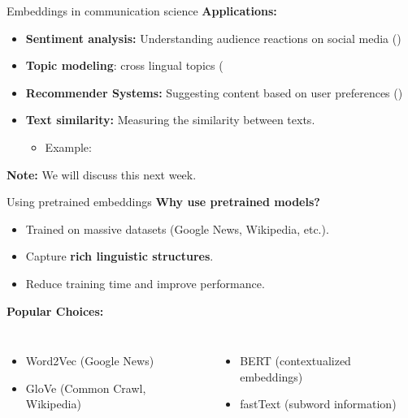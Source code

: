 \documentclass[handout]{beamer}
\begin{document}
\begin{frame}[fragile]{Embeddings in communication science}
    \textbf{Applications:}
    \begin{itemize}
        \item \textbf{Sentiment analysis:} Understanding audience reactions on social media (\cite{rudkowsky2018more})
        \item \textbf{Topic modeling}: cross lingual topics (\cite{han2020reproducible)}
        \item \textbf{Recommender Systems:} Suggesting content based on user preferences (\cite{Loecherbach2020})
    \item \textbf{Text similarity:} Measuring the similarity between texts.
        \begin{itemize}
            \item Example: \cite{Brinberg2021}
        \end{itemize}
\end{itemize}
\textbf{Note:} We will discuss this next week.
\end{frame}


\begin{frame}{Using pretrained embeddings}
    \textbf{Why use pretrained models?}
    \begin{itemize}
        \item Trained on massive datasets (Google News, Wikipedia, etc.).
        \item Capture \textbf{rich linguistic structures}.
        \item Reduce training time and improve performance.
    \end{itemize}
    \pause
    \textbf{Popular Choices:}
    \begin{columns}
        \begin{itemize}
            \item Word2Vec (Google News)
            \item GloVe (Common Crawl, Wikipedia)
        \end{itemize}
        \begin{itemize}
            \item BERT (contextualized embeddings)
            \item fastText (subword information)
        \end{itemize}
    \end{columns}
\end{frame}
\end{document}
